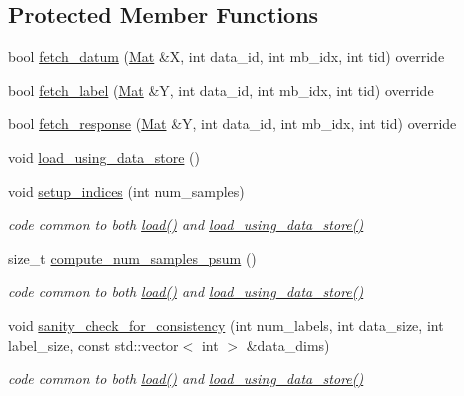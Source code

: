 \subsection*{Protected Member Functions}
\begin{DoxyCompactItemize}
\item 
bool \hyperlink{classlbann_1_1data__reader__merge__samples_a413a54d7ccac03bfacdf63cf871fd378}{fetch\+\_\+datum} (\hyperlink{base_8hpp_a68f11fdc31b62516cb310831bbe54d73}{Mat} \&X, int data\+\_\+id, int mb\+\_\+idx, int tid) override
\item 
bool \hyperlink{classlbann_1_1data__reader__merge__samples_a93ce622e95e7ea0438bc78bdda8df44f}{fetch\+\_\+label} (\hyperlink{base_8hpp_a68f11fdc31b62516cb310831bbe54d73}{Mat} \&Y, int data\+\_\+id, int mb\+\_\+idx, int tid) override
\item 
bool \hyperlink{classlbann_1_1data__reader__merge__samples_ab39ad6b6e106eb30f58f9eabaf3352ad}{fetch\+\_\+response} (\hyperlink{base_8hpp_a68f11fdc31b62516cb310831bbe54d73}{Mat} \&Y, int data\+\_\+id, int mb\+\_\+idx, int tid) override
\item 
void \hyperlink{classlbann_1_1data__reader__merge__samples_ad45275b73fcbca47b74a9c9767f69bc9}{load\+\_\+using\+\_\+data\+\_\+store} ()
\item 
void \hyperlink{classlbann_1_1data__reader__merge__samples_ae5fe8d5cf8eb1a6aa715579d329a620e}{setup\+\_\+indices} (int num\+\_\+samples)
\begin{DoxyCompactList}\small\item\em code common to both \hyperlink{classlbann_1_1data__reader__merge__samples_ab3554341417f5eba95b9c1098af40410}{load()} and \hyperlink{classlbann_1_1data__reader__merge__samples_ad45275b73fcbca47b74a9c9767f69bc9}{load\+\_\+using\+\_\+data\+\_\+store()} \end{DoxyCompactList}\item 
size\+\_\+t \hyperlink{classlbann_1_1data__reader__merge__samples_aafa54258bdc9d888da61c817462cdf65}{compute\+\_\+num\+\_\+samples\+\_\+psum} ()
\begin{DoxyCompactList}\small\item\em code common to both \hyperlink{classlbann_1_1data__reader__merge__samples_ab3554341417f5eba95b9c1098af40410}{load()} and \hyperlink{classlbann_1_1data__reader__merge__samples_ad45275b73fcbca47b74a9c9767f69bc9}{load\+\_\+using\+\_\+data\+\_\+store()} \end{DoxyCompactList}\item 
void \hyperlink{classlbann_1_1data__reader__merge__samples_a240368aa9f7f2ab1fa7c8d534b7f54ed}{sanity\+\_\+check\+\_\+for\+\_\+consistency} (int num\+\_\+labels, int data\+\_\+size, int label\+\_\+size, const std\+::vector$<$ int $>$ \&data\+\_\+dims)
\begin{DoxyCompactList}\small\item\em code common to both \hyperlink{classlbann_1_1data__reader__merge__samples_ab3554341417f5eba95b9c1098af40410}{load()} and \hyperlink{classlbann_1_1data__reader__merge__samples_ad45275b73fcbca47b74a9c9767f69bc9}{load\+\_\+using\+\_\+data\+\_\+store()} \end{DoxyCompactList}\end{DoxyCompactItemize}
